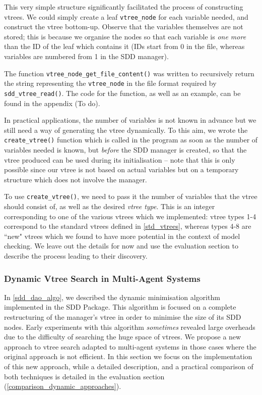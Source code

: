 \documentclass[11pt]{article}
\begin{document}
This very simple structure significantly facilitated the process of constructing vtrees. We could simply create a leaf \texttt{vtree\_node} for each variable needed, and construct the vtree bottom-up. Observe that the variables themselves are not stored; this is because we organise the nodes so that each variable is \textit{one more} than the ID of the leaf which contains it (IDs start from 0 in the file, whereas variables are numbered from 1 in the SDD manager).

 The function \texttt{vtree\_node\_get\_file\_content()} was written to recursively return the string representing the \texttt{vtree\_node} in the file format required by \texttt{sdd\_vtree\_read()}. The code for the function, as well as an example, can be found in the appendix (To do). 

In practical applications, the number of variables is not known in advance but we still need a way of generating the vtree dynamically. To this aim, we wrote the \texttt{create\_vtree()} function which is called in the program as soon as the number of variables needed is known, but \textit{before} the SDD manager is created, so that the vtree produced can be used during its initialisation -- note that this is only possible since our vtree is not based on actual variables but on a temporary structure which does not involve the manager. 

To use \texttt{create\_vtree()}, we need to pass it the number of variables that the vtree should consist of, as well as the desired \textit{vtree type}. This is an integer corresponding to one of the various vtrees which we implemented: vtree types 1-4 correspond to the standard vtrees defined in \ref{std_vtrees}, whereas types 4-8 are ``new" vtrees which we found to have more potential in the context of model checking. We leave out the details for now and use the evaluation section to describe the process leading to their discovery. 

\subsubsection{Dynamic Vtree Search in Multi-Agent Systems}

In \ref{sdd_dao_algo}, we described the dynamic minimisation algorithm implemented in the SDD Package. This algorithm is focused on a complete restructuring of the manager's vtree in order to minimise the size of its SDD nodes.
Early experiments with this algorithm \textit{sometimes }revealed large overheads due to the difficulty of searching the huge space of vtrees. We propose a new approach to vtree search adapted to multi-agent systems in those cases where the original approach is not efficient. In this section we focus on the implementation of this new approach, while a detailed description, and a practical comparison of both techniques is detailed in the evaluation section (\ref{comparison_dynamic_approaches}).
\end{document}
